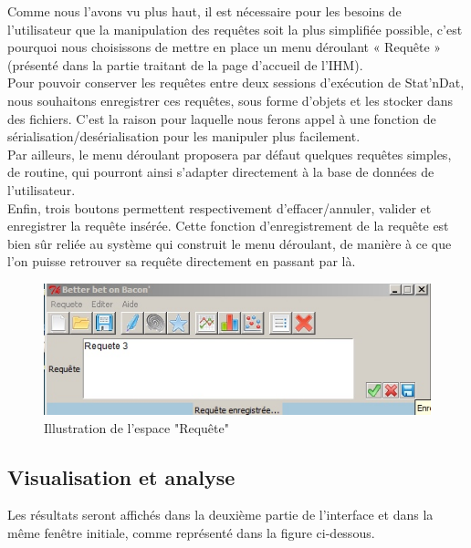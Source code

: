 \documentclass[a4paper,10pt]{report}
\begin{document}
Comme nous l’avons vu plus haut, il est nécessaire pour les besoins de l’utilisateur que la manipulation des requêtes soit la plus simplifiée possible, c’est pourquoi nous choisissons de mettre en place un menu déroulant « Requête » (présenté dans la partie traitant de la page d’accueil de l’IHM).\\

Pour pouvoir conserver les requêtes entre deux sessions d’exécution de Stat’nDat, nous souhaitons enregistrer ces requêtes, sous forme d’objets et les stocker dans des fichiers. C’est la raison pour laquelle nous ferons appel à une fonction de sérialisation/desérialisation pour les manipuler plus facilement. \\

Par ailleurs, le menu déroulant proposera par défaut quelques requêtes simples, de routine, qui pourront ainsi s’adapter directement à la base de données de l’utilisateur.\\

Enfin, trois boutons permettent respectivement d’effacer/annuler, valider et enregistrer la requête insérée. Cette fonction d’enregistrement de la requête est bien sûr reliée au système qui construit le menu déroulant, de manière à ce que l’on puisse retrouver sa requête directement en passant par là.


\begin{figure}[H]

\centering
\includegraphics[scale=0.6]{requ.jpg}
\caption{Illustration de l'espace "Requête"}

\end{figure}


\subsection{Visualisation et analyse}

Les résultats seront affichés dans la deuxième partie de l'interface et dans la même fenêtre initiale, comme représenté dans la figure ci-dessous.
\end{document}
